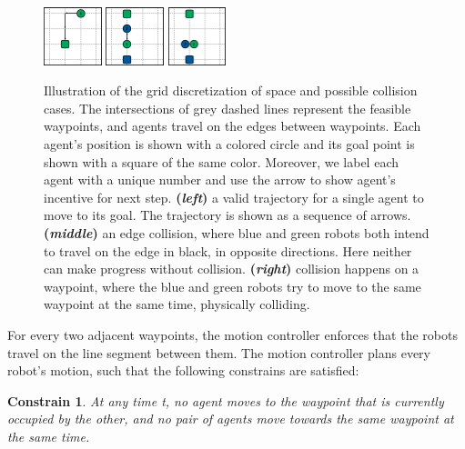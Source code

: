\documentclass[journal]{IEEEtran}
\newtheorem{constrain}{Constrain}[subsection]
\begin{document}
\begin{figure}[h]
    \centering
    \includegraphics[width=0.15\textwidth]{traffic1/00.jpg}
    \hfill
    \includegraphics[width=0.15\textwidth]{traffic1/01.jpg}
    \hfill
    \includegraphics[width=0.15\textwidth]{traffic1/02.jpg}
    \caption{Illustration of the grid discretization of space and possible collision cases. The intersections of grey dashed lines represent the feasible waypoints, and agents travel on the edges between waypoints.  Each agent's position is shown with a colored circle and its goal point is shown with a square of the same color. Moreover, we label each agent with a unique number and use the arrow to show agent's incentive for next step. \textbf{(\textit{left})} a valid trajectory for a single agent to move to its goal.  The trajectory is shown as a sequence of arrows.  \textbf{(\textit{middle})} an edge collision, where blue and green robots both intend to travel on the edge in black, in opposite directions.  Here neither can make progress without collision.  \textbf{(\textit{right})} collision happens on a waypoint, where the blue and green robots try to move to the same waypoint at the same time, physically colliding.}
    \label{fig:grid}
\end{figure}


For every two adjacent waypoints, the motion controller enforces that the robots travel on the line segment between them. The motion controller plans every robot's motion, such that the following constrains are satisfied:



\begin{constrain} At any time t, no agent moves to the waypoint that is currently occupied by the other, and no pair of agents move towards the same waypoint at the same time.\label{cmp1}\end{constrain}
\end{document}
